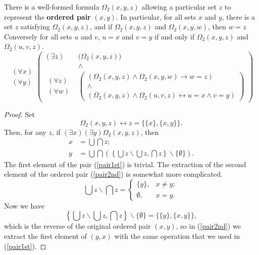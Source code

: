 \documentclass[letterpaper]{article}
\begin{document}
\begin{theorem}
	There is a well-formed formula $\Omega_2(x,y,z)$ allowing a particular set $z$ to represent the \textbf{ordered pair} $(x,y)$.  In particular, for all sets $x$ and $y$, there is a set $z$ satisfying $\Omega_2(x,y,z)$, and if $\Omega_2(x,y,z)$ and $\Omega_2(x,y,w)$, then $w=z$  Conversely for all sets $u$ and $v$, $u=x$ and $v=y$ if and only if $\Omega_2(x,y,z)$ and $\Omega_2(u,v,z)$.
	\begin{equation}
		\begin{array}{r}(\forall x)\\(\forall y)\end{array}
		\left(\begin{array}{rl}
			(\exists z)&\big(\Omega_2(x,y,z)\big)\\
			&\land\\
			\begin{array}{r}(\forall z)\\(\forall w)\end{array}&
				\left(\begin{array}{c}(\Omega_2(x,y,z)\land\Omega_2(x,y,w)\longrightarrow w=z)\\
			\land\\
			(\Omega_2(x,y,z)\land\Omega_2(u,v,z)\longleftrightarrow u=x		
			\land v=y)\end{array}\right)
		\end{array}\right)
	\end{equation}
\end{theorem}
\begin{proof}
Set
	\begin{equation}
		\Omega_2(x,y,z) \longleftrightarrow z=\big\{\{x\},\{x,y\}\big\}.
	\end{equation}
Then, for any $z$, if $(\exists x)(\exists y)\Omega_2(x,y,z)$, then
	\begin{align}
		x &= \bigcup \bigcap z;\label{pair1st}\\
		y &= \bigcup \bigcap \left(\left\{\bigcup z\operatorname{\backslash}\bigcup z,\bigcap z\right\}\operatorname{\backslash}\{\emptyset\}\right).\label{pair2nd}
	\end{align}
	The first element of the pair (\ref{pair1st}) is trivial. The extraction of the second element of the ordered pair (\ref{pair2nd}) is somewhat more complicated.
	\begin{equation}
	\bigcup z \operatorname{\backslash}\bigcap z = \left\{\begin{array}{cr}
	\{y\},&x\ne y;\\\emptyset,&x=y.
	\end{array}\right.
	\end{equation}
	Now we have
	\begin{equation}
	\left\{\bigcup z\operatorname{\backslash}\bigcup z, \bigcap z\right\}\operatorname{\backslash}\{\emptyset\} = \{\{y\},\{x,y\}\},
	\end{equation}
	which is the reverse of the original ordered pair $(x,y)$, so in (\ref{pair2nd}) we extract the first element of $(y,x)$ with the same operation that we used in (\ref{pair1st}).
\end{proof}
\end{document}
